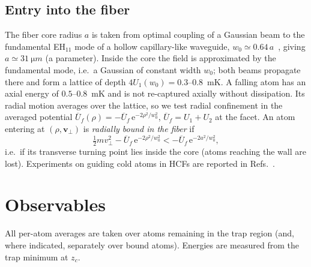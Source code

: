 \documentclass[11pt,a4paper]{article}
\newcommand{\ee}{\mathrm{e}}
\newcommand{\vperp}{\bm{v}_\perp}
\begin{document}
\subsection{Entry into the fiber}
The fiber core radius $a$ is taken from optimal coupling of a Gaussian beam to the fundamental EH$_{11}$ mode of a hollow capillary-like waveguide, $w_0\simeq0.64\,a$~\cite{Marcatili1964,Abrams1972}, giving $a\simeq\SI{31}{\micro m}$ (a parameter). Inside the core the field is approximated by the fundamental mode, i.e.\ a Gaussian of constant width $w_0$; both beams propagate there and form a lattice of depth $4U_1(w_0)=0.3$--\SI{0.8}{mK}. A falling atom has an axial energy of $0.5$--\SI{0.8}{mK} and is not re-captured axially without dissipation. Its radial motion averages over the lattice, so we test radial confinement in the averaged potential $\overline U_f(\rho)=-\overline U_f\,\ee^{-2\rho^2/w_0^2}$, $\overline U_f=U_1+U_2$ at the facet. An atom entering at $(\rho,\vperp)$ is \emph{radially bound in the fiber} if
\begin{equation}
\tfrac12 m v_\perp^2-\overline U_f\,\ee^{-2\rho^2/w_0^2}<-\overline U_f\,\ee^{-2a^2/w_0^2},
\end{equation}
i.e.\ if its transverse turning point lies inside the core (atoms reaching the wall are lost). Experiments on guiding cold atoms in HCFs are reported in Refs.~\cite{Christensen2008,Bajcsy2011,Okaba2014,Langbecker2018,Hilton2018}.

\section{Observables}
\label{sec:observables}

All per-atom averages are taken over atoms remaining in the trap region (and, where indicated, separately over bound atoms). Energies are measured from the trap minimum at $z_c$.
\end{document}
